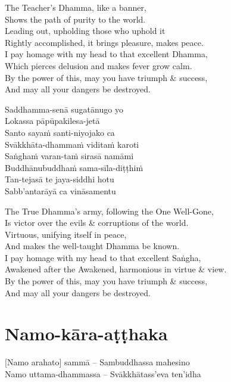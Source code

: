 \begin{english-verses}
  The Teacher's Dhamma, like a banner,\\
  Shows the path of purity to the world.\\
  Leading out, upholding those who uphold it\\
  Rightly accomplished, it brings pleasure, makes peace.\\
  I pay homage with my head to that excellent Dhamma,\\
  Which pierces delusion and makes fever grow calm.\\
  By the power of this, may you have triumph \& success,\\
  And may all your dangers be destroyed.
\end{english-verses}

Saddhamma-senā sugatānugo yo\\
Lokassa pāpūpakilesa-jetā\\
Santo sayaṁ santi-niyojako ca\\
Svākkhāta-dhammaṁ viditaṁ karoti\\
Saṅghaṁ varan-taṁ sirasā namāmi\\
Buddhānubuddhaṁ sama-sīla-diṭṭhiṁ\\
Tan-tejasā te jaya-siddhi hotu\\
Sabb'antarāyā ca vināsamentu

\begin{english-verses}
  The True Dhamma's army, following the One Well-Gone,\\
  Is victor over the evils \& corruptions of the world.\\
  Virtuous, unifying itself in peace,\\
  And makes the well-taught Dhamma be known.\\
  I pay homage with my head to that excellent Saṅgha,\\
  Awakened after the Awakened, harmonious in virtue \& view.\\
  By the power of this, may you have triumph \& success,\\
  And may all your dangers be destroyed.
\end{english-verses}

\suttaRef{[Thai]}

\section{Namo-kāra-aṭṭhaka}
\label{namo-kara-atthaka}
[Namo arahato] sammā – Sambuddhassa mahesino\\
Namo uttama-dhammassa – Svākkhātass'eva ten'idha

